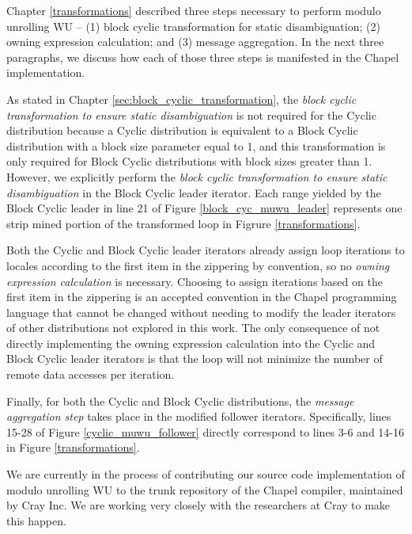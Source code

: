 Chapter \ref{transformations} described three steps necessary to perform modulo unrolling WU -- (1) block cyclic transformation for static disambiguation; (2) owning expression calculation; and (3) message aggregation. In the next three paragraphs, we discuss how each of those three steps is manifested in the Chapel implementation. 

As stated in Chapter \ref{sec:block_cyclic_transformation}, the \textit{block cyclic transformation to ensure static disambiguation} is not required for the Cyclic distribution because a Cyclic distribution is equivalent to a Block Cyclic distribution with a block size parameter equal to 1, and this transformation is only required for Block Cyclic distributions with block sizes greater than 1. However, we explicitly perform the \textit{block cyclic transformation to ensure static disambiguation} in the Block Cyclic leader iterator. Each range yielded by the Block Cyclic leader in line 21 of Figure \ref{block_cyc_muwu_leader} represents one strip mined portion of the transformed loop in Figrure \ref{transformations}.

Both the Cyclic and Block Cyclic leader iterators already assign loop iterations to locales according to the first item in the zippering by convention, so no \textit{owning expression calculation} is necessary. Choosing to assign iterations based on the first item in the zippering is an accepted convention in the Chapel programming language that cannot be changed without needing to modify the leader iterators of other distributions not explored in this work. The only consequence of not directly implementing the owning expression calculation into the Cyclic and Block Cyclic leader iterators is that the loop will not minimize the number of remote data accesses per iteration. 

Finally, for both the Cyclic and Block Cyclic distributions, the \textit{message aggregation step} takes place in the modified follower iterators. Specifically, lines 15-28 of Figure \ref{cyclic_muwu_follower} directly correspond to lines 3-6 and 14-16 in Figure \ref{transformations}.

We are currently in the process of contributing our source code implementation of modulo unrolling WU to the trunk repository of the Chapel compiler, maintained by Cray Inc. We are working very closely with the researchers at Cray to make this happen. 

